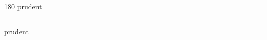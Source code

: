 
\begin{frame}
\begin{center}
\begin{turn}{180}
{\fontsize{2.5cm}{1em}\selectfont prudent}
\end{turn}
\vspace{1em}\par  
\hrule
\vspace{1em}\par  
{\fontsize{2.5cm}{1em}\selectfont prudent}
\end{center}
\end{frame}
